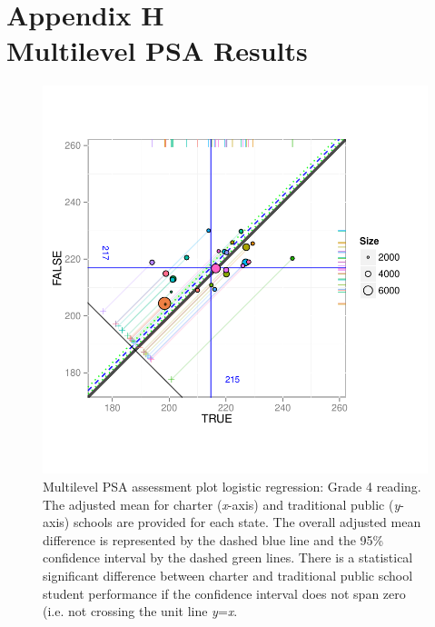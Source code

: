 \section*{Appendix H\\Multilevel PSA Results}
\label{appendixH}

\begin{figure}[h!]
\begin{center}
\includegraphics[width=\textwidth,trim=0 .6in 0 .6in]{../Figures2009/g4read-mlpsa-lr-circ.pdf}
\caption[Multilevel PSA assessment plot logistic regression: Grade 4 reading]{Multilevel PSA assessment plot logistic regression: Grade 4 reading. The adjusted mean for charter (\textit{x}-axis) and traditional public (\textit{y}-axis) schools are provided for each state. The overall adjusted mean difference is represented by the dashed blue line and the 95\% confidence interval by the dashed green lines. There is a statistical significant difference between charter and traditional public school student performance if the confidence interval does not span zero (i.e. not crossing the unit line \textit{y}=\textit{x}.}
\end{center}
\end{figure}


